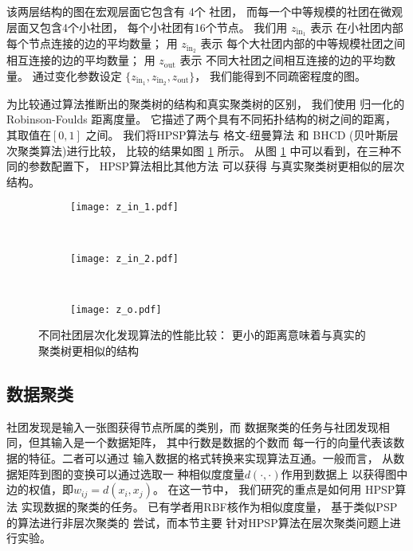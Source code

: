 该两层结构的图在宏观层面它包含有 4个 社团，
而每一个中等规模的社团在微观层面又包含4个小社团，
每个小社团有16个节点。
我们用 $z_{\mathrm{in}_1}$ 表示
在小社团内部每个节点连接的边的平均数量；
用 $z_{\mathrm{in}_2}$ 表示
每个大社团内部的中等规模社团之间相互连接的边的平均数量；
用 $z_{\mathrm{out}}$ 表示
不同大社团之间相互连接的边的平均数量。
通过变化参数设定
$\{z_{\mathrm{in}_1}, z_{\mathrm{in}_2}, z_{\mathrm{out}} \}$，
我们能得到不同疏密程度的图。

为比较通过算法推断出的聚类树的结构和真实聚类树的区别，
我们使用 归一化的 Robinson-Foulds 距离度量\cite{robinson1981comparison}。
它描述了两个具有不同拓扑结构的树之间的距离，
其取值在$[0,1]$ 之间。
我们将HPSP算法与
格文-纽曼算法\cite{girvan2002community}
和 BHCD (贝叶斯层次聚类算法\cite{blundell2013bhcd})进行比较，
比较的结果如图 \ref{fig:cdr} 所示。
从图 \ref{fig:cdr} 中可以看到，在三种不同的参数配置下，
HPSP算法相比其他方法 可以获得
与真实聚类树更相似的层次结构。

\begin{figure}
	\centering
	\begin{subfigure}{0.33\textwidth}
		\texttt{[image: z\_in\_1.pdf]}
		\caption{}
	\end{subfigure}~
	\begin{subfigure}{0.33\textwidth}
		\texttt{[image: z\_in\_2.pdf]}
		\caption{}
	\end{subfigure}~
	\begin{subfigure}{0.33\textwidth}
		\texttt{[image: z\_o.pdf]}
		\caption{}
	\end{subfigure}
	\caption{不同社团层次化发现算法的性能比较：
  更小的距离意味着与真实的聚类树更相似的结构}
  \label{fig:cdr}
\end{figure}

\subsection{数据聚类}
\label{sec:data_clustering}
社团发现是输入一张图获得节点所属的类别，而
数据聚类的任务与社团发现相同，但其输入是一个数据矩阵，
其中行数是数据的个数而
每一行的向量代表该数据的特征。二者可以通过
输入数据的格式转换来实现算法互通。一般而言，
从数据矩阵到图的变换可以通过选取一
种相似度度量$d(\cdot,\cdot)$作用到数据上
以获得图中边的权值，即$w_{ij}=d(x_i, x_j)$。
在这一节中，
我们研究的重点是如何用
HPSP算法 实现数据的聚类的任务。
已有学者用RBF核作为相似度度量，
基于类似PSP的算法进行非层次聚类的
尝试\cite{mac}，而本节主要
针对HPSP算法在层次聚类问题上进行实验。

